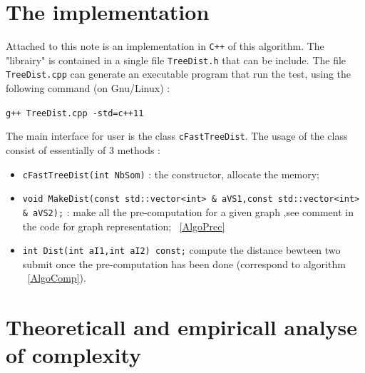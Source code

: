 \documentclass[a4paper]{article}
\begin{document}
\section{The implementation}

Attached to this note is an implementation in {\tt C++} of this algorithm.
The "librairy" is contained in a single file {\tt TreeDist.h} that can be include.
The file {\tt TreeDist.cpp} can generate an executable program that run the test,
using the following command (on Gnu/Linux) :

{\tt g++ TreeDist.cpp  -std=c++11}


The main interface for user is the class {\tt cFastTreeDist}. The usage of the class
consist of essentially of $3$ methods :

\begin{itemize}
   \item {\tt cFastTreeDist(int NbSom)} : the constructor, allocate the memory;


   \item {\tt void MakeDist(const std::vector<int> \& aVS1,const std::vector<int> \& aVS2);} : make all the
         pre-computation for a given graph ,see comment in the code for graph representation;
~\ref{AlgoPrec}

   \item {\tt int Dist(int aI1,int aI2) const;}   compute the distance bewteen two submit once
        the pre-computation has been done (correspond to algorithm ~\ref{AlgoComp}).
\end{itemize}


\section{Theoreticall and empiricall analyse of complexity}
\end{document}
